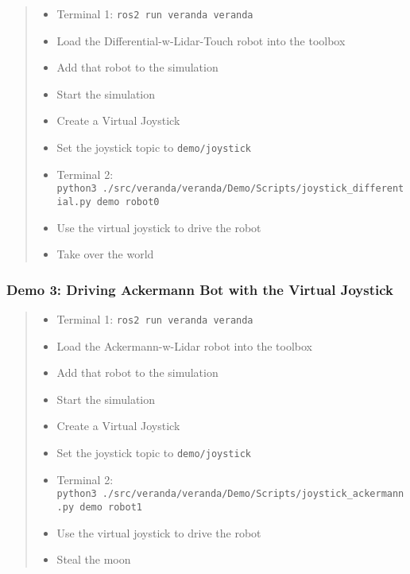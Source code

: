 \begin{quote}
\begin{itemize}
\tightlist
\item
  Terminal 1: \texttt{ros2\ run\ veranda\ veranda}
\item
  Load the Differential-w-Lidar-Touch robot into the toolbox
\item
  Add that robot to the simulation
\item
  Start the simulation
\item
  Create a Virtual Joystick
\item
  Set the joystick topic to \texttt{demo/joystick}
\item
  Terminal 2:
  \texttt{python3\ ./src/veranda/veranda/Demo/Scripts/joystick\_differential.py\ demo\ robot0}
\item
  Use the virtual joystick to drive the robot
\item
  Take over the world
\end{itemize}
\end{quote}

\hypertarget{demo-3-driving-ackermann-bot-with-the-virtual-joystick}{%
\subsubsection{Demo 3: Driving Ackermann Bot with the Virtual
Joystick}\label{demo-3-driving-ackermann-bot-with-the-virtual-joystick}}

\begin{quote}
\begin{itemize}
\tightlist
\item
  Terminal 1: \texttt{ros2\ run\ veranda\ veranda}
\item
  Load the Ackermann-w-Lidar robot into the toolbox
\item
  Add that robot to the simulation
\item
  Start the simulation
\item
  Create a Virtual Joystick
\item
  Set the joystick topic to \texttt{demo/joystick}
\item
  Terminal 2:
  \texttt{python3\ ./src/veranda/veranda/Demo/Scripts/joystick\_ackermann.py\ demo\ robot1}
\item
  Use the virtual joystick to drive the robot
\item
  Steal the moon
\end{itemize}
\end{quote}

